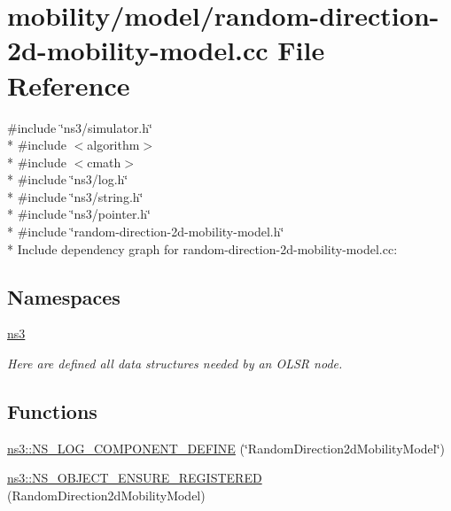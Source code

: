 \hypertarget{random-direction-2d-mobility-model_8cc}{}\section{mobility/model/random-\/direction-\/2d-\/mobility-\/model.cc File Reference}
\label{random-direction-2d-mobility-model_8cc}
{\ttfamily \#include \char`\"{}ns3/simulator.\+h\char`\"{}}\\*
{\ttfamily \#include $<$algorithm$>$}\\*
{\ttfamily \#include $<$cmath$>$}\\*
{\ttfamily \#include \char`\"{}ns3/log.\+h\char`\"{}}\\*
{\ttfamily \#include \char`\"{}ns3/string.\+h\char`\"{}}\\*
{\ttfamily \#include \char`\"{}ns3/pointer.\+h\char`\"{}}\\*
{\ttfamily \#include \char`\"{}random-\/direction-\/2d-\/mobility-\/model.\+h\char`\"{}}\\*
Include dependency graph for random-\/direction-\/2d-\/mobility-\/model.cc\+:
\subsection*{Namespaces}
\begin{DoxyCompactItemize}
\item 
 \hyperlink{namespacens3}{ns3}
\begin{DoxyCompactList}\small\item\em Here are defined all data structures needed by an O\+L\+SR node. \end{DoxyCompactList}\end{DoxyCompactItemize}
\subsection*{Functions}
\begin{DoxyCompactItemize}
\item 
\hyperlink{namespacens3_a16168293889f4ec52f197443a92da41e}{ns3\+::\+N\+S\+\_\+\+L\+O\+G\+\_\+\+C\+O\+M\+P\+O\+N\+E\+N\+T\+\_\+\+D\+E\+F\+I\+NE} (\char`\"{}Random\+Direction2d\+Mobility\+Model\char`\"{})
\item 
\hyperlink{namespacens3_a4bc87582409c94540142d912cbf236d7}{ns3\+::\+N\+S\+\_\+\+O\+B\+J\+E\+C\+T\+\_\+\+E\+N\+S\+U\+R\+E\+\_\+\+R\+E\+G\+I\+S\+T\+E\+R\+ED} (Random\+Direction2d\+Mobility\+Model)
\end{DoxyCompactItemize}
